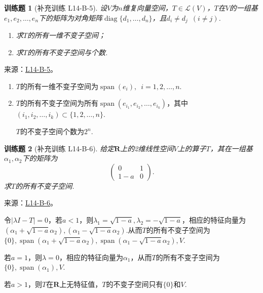 \documentclass[12pt,fontset=fandol]{ctexart}
\newtheorem{exercise}{训练题}[section]
\begin{document}
\begin{exercise}[补充训练 L14-B-5]\label{prob:L14-B-5}
设$V$为$n$维复向量空间，$T\in \mathcal{L}(V)$，$T$在$V$的一组基$e_1,e_2,\ldots,e_n$下的矩阵为对角矩阵$\operatorname{diag}\{d_1,\ldots,d_n\}$，且$d_i\neq d_j\enspace(i\neq j)$.
        \begin{enumerate}
            \item 求$T$的所有一维不变子空间；

            \item 求$T$的所有不变子空间与个数.
        \end{enumerate}
\end{exercise}
\noindent 来源：\href{https://github.com/yhwu-is/Linear-Algebra-Left-Undone/blob/new/%E8%AE%B2%E4%B9%89/%E4%B8%93%E9%A2%98/14%20%E7%9B%B8%E4%BC%BC%E6%A0%87%E5%87%86%E5%BD%A2%EF%BC%9A%E5%8A%A8%E6%9C%BA%E4%B8%8E%E5%9F%BA%E7%A1%80.tex}{L14-B-5}。
\begin{solve}
\begin{enumerate}
                \item $T$的所有一维不变子空间为$\operatorname{span}(e_i),\enspace i=1,2,\ldots,n$.
                \item $T$的所有不变子空间为所有$\operatorname{span}(e_{i_1},e_{i_2},\ldots,e_{i_k})$，其中$(i_1,i_2,\ldots,i_k)\subset\{1,2,\ldots,n\}$.

                $T$的不变子空间个数为$2^n$.
            \end{enumerate}
\end{solve}

\begin{exercise}[补充训练 L14-B-6]\label{prob:L14-B-6}
给定$\mathbf{R}$上的2维线性空间$V$上的算子$T$，其在一组基$\alpha_1,\alpha_2$下的矩阵为
        \[\begin{pmatrix}
                0 & 1 \\ 1-a & 0
            \end{pmatrix}.\]
        求$T$的所有不变子空间.
\end{exercise}
\noindent 来源：\href{https://github.com/yhwu-is/Linear-Algebra-Left-Undone/blob/new/%E8%AE%B2%E4%B9%89/%E4%B8%93%E9%A2%98/14%20%E7%9B%B8%E4%BC%BC%E6%A0%87%E5%87%86%E5%BD%A2%EF%BC%9A%E5%8A%A8%E6%9C%BA%E4%B8%8E%E5%9F%BA%E7%A1%80.tex}{L14-B-6}。
\begin{solve}
令$|\lambda I-T|=0$，若$a<1$，则$\lambda_1=\sqrt{1-a},\lambda_2=-\sqrt{1-a}$，相应的特征向量为$(\alpha_1+\sqrt{1-a}\alpha_2),(\alpha_1-\sqrt{1-a}\alpha_2)$.从而$T$的所有不变子空间为$\{0\},\operatorname{span}(\alpha_1+\sqrt{1-a}\alpha_2),\operatorname{span}(\alpha_1-\sqrt{1-a}\alpha_2),V$.

            若$a=1$，则$\lambda=0$，相应的特征向量为$\alpha_1$，从而$T$的所有不变子空间为$\{0\},\operatorname{span}(\alpha_1),V$.

            若$a>1$，则$T$在$\mathbf{R}$上无特征值，$T$的不变子空间只有$\{0\}$和$V$.
\end{solve}
\end{document}
